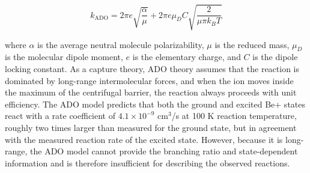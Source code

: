 \begin{equation}
	k_{\text{ADO}} = 2 \pi e \sqrt{\frac{\alpha}{\mu}} + 2 \pi e \mu_D C \sqrt{\frac{2}{\mu \pi k_B T}}
\end{equation}

where $\alpha$ is the average neutral molecule polarizability, $\mu$ is the reduced mass, $\mu_D$ is the molecular dipole moment, $e$ is the elementary charge, and $C$ is the dipole locking constant. As a capture theory, ADO theory assumes that the reaction is dominated by long-range intermolecular forces, and when the ion moves inside the maximum of the centrifugal barrier, the reaction always proceeds with unit efficiency. The ADO model predicts that both the ground and excited Be+ states react with a rate coefficient of $4.1 \times 10^{-9}$ cm$^3$/s at 100 K reaction temperature, roughly two times larger than measured for the ground state, but in agreement with the measured reaction rate of the excited state. However, because it is long-range, the ADO model cannot provide the branching ratio and state-dependent information and is therefore insufficient for describing the observed reactions.
